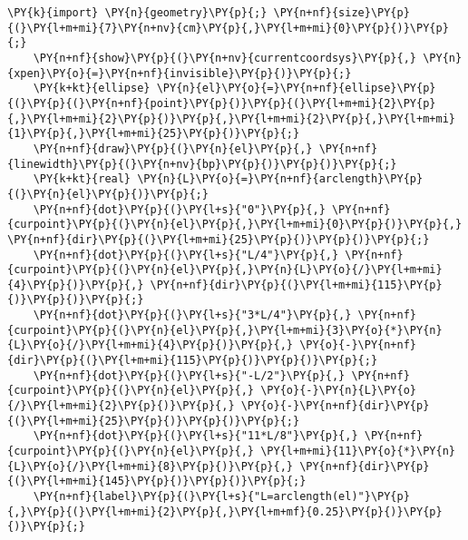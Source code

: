\begin{Verbatim}[commandchars=\\\{\}]
    \PY{k}{import} \PY{n}{geometry}\PY{p}{;} \PY{n+nf}{size}\PY{p}{(}\PY{l+m+mi}{7}\PY{n+nv}{cm}\PY{p}{,}\PY{l+m+mi}{0}\PY{p}{)}\PY{p}{;}
    \PY{n+nf}{show}\PY{p}{(}\PY{n+nv}{currentcoordsys}\PY{p}{,} \PY{n}{xpen}\PY{o}{=}\PY{n+nf}{invisible}\PY{p}{)}\PY{p}{;}
    \PY{k+kt}{ellipse} \PY{n}{el}\PY{o}{=}\PY{n+nf}{ellipse}\PY{p}{(}\PY{p}{(}\PY{n+nf}{point}\PY{p}{)}\PY{p}{(}\PY{l+m+mi}{2}\PY{p}{,}\PY{l+m+mi}{2}\PY{p}{)}\PY{p}{,}\PY{l+m+mi}{2}\PY{p}{,}\PY{l+m+mi}{1}\PY{p}{,}\PY{l+m+mi}{25}\PY{p}{)}\PY{p}{;}
    \PY{n+nf}{draw}\PY{p}{(}\PY{n}{el}\PY{p}{,} \PY{n+nf}{linewidth}\PY{p}{(}\PY{n+nv}{bp}\PY{p}{)}\PY{p}{)}\PY{p}{;}
    \PY{k+kt}{real} \PY{n}{L}\PY{o}{=}\PY{n+nf}{arclength}\PY{p}{(}\PY{n}{el}\PY{p}{)}\PY{p}{;}
    \PY{n+nf}{dot}\PY{p}{(}\PY{l+s}{"0"}\PY{p}{,} \PY{n+nf}{curpoint}\PY{p}{(}\PY{n}{el}\PY{p}{,}\PY{l+m+mi}{0}\PY{p}{)}\PY{p}{,} \PY{n+nf}{dir}\PY{p}{(}\PY{l+m+mi}{25}\PY{p}{)}\PY{p}{)}\PY{p}{;}
    \PY{n+nf}{dot}\PY{p}{(}\PY{l+s}{"L/4"}\PY{p}{,} \PY{n+nf}{curpoint}\PY{p}{(}\PY{n}{el}\PY{p}{,}\PY{n}{L}\PY{o}{/}\PY{l+m+mi}{4}\PY{p}{)}\PY{p}{,} \PY{n+nf}{dir}\PY{p}{(}\PY{l+m+mi}{115}\PY{p}{)}\PY{p}{)}\PY{p}{;}
    \PY{n+nf}{dot}\PY{p}{(}\PY{l+s}{"3*L/4"}\PY{p}{,} \PY{n+nf}{curpoint}\PY{p}{(}\PY{n}{el}\PY{p}{,}\PY{l+m+mi}{3}\PY{o}{*}\PY{n}{L}\PY{o}{/}\PY{l+m+mi}{4}\PY{p}{)}\PY{p}{,} \PY{o}{-}\PY{n+nf}{dir}\PY{p}{(}\PY{l+m+mi}{115}\PY{p}{)}\PY{p}{)}\PY{p}{;}
    \PY{n+nf}{dot}\PY{p}{(}\PY{l+s}{"-L/2"}\PY{p}{,} \PY{n+nf}{curpoint}\PY{p}{(}\PY{n}{el}\PY{p}{,} \PY{o}{-}\PY{n}{L}\PY{o}{/}\PY{l+m+mi}{2}\PY{p}{)}\PY{p}{,} \PY{o}{-}\PY{n+nf}{dir}\PY{p}{(}\PY{l+m+mi}{25}\PY{p}{)}\PY{p}{)}\PY{p}{;}
    \PY{n+nf}{dot}\PY{p}{(}\PY{l+s}{"11*L/8"}\PY{p}{,} \PY{n+nf}{curpoint}\PY{p}{(}\PY{n}{el}\PY{p}{,} \PY{l+m+mi}{11}\PY{o}{*}\PY{n}{L}\PY{o}{/}\PY{l+m+mi}{8}\PY{p}{)}\PY{p}{,} \PY{n+nf}{dir}\PY{p}{(}\PY{l+m+mi}{145}\PY{p}{)}\PY{p}{)}\PY{p}{;}
    \PY{n+nf}{label}\PY{p}{(}\PY{l+s}{"L=arclength(el)"}\PY{p}{,}\PY{p}{(}\PY{l+m+mi}{2}\PY{p}{,}\PY{l+m+mf}{0.25}\PY{p}{)}\PY{p}{)}\PY{p}{;}
\end{Verbatim}
